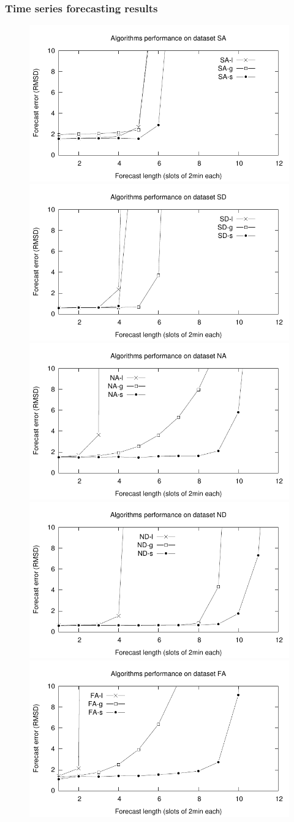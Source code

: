 \documentclass[12pt,a4paper,twoside,openright]{book}
\begin{document}
\subsubsection{Time series forecasting results}
\label{subsubsec:timeseries}
\begin{figure}
	\parbox{0.5\columnwidth}{\includegraphics[width=0.49\columnwidth]{img/algorithms-sa}}
	\parbox{0.5\columnwidth}{\includegraphics[width=0.49\columnwidth]{img/algorithms-sd}}
	\parbox{0.5\columnwidth}{\includegraphics[width=0.49\columnwidth]{img/algorithms-na}}
	\parbox{0.5\columnwidth}{\includegraphics[width=0.49\columnwidth]{img/algorithms-nd}}
	\parbox{0.5\columnwidth}{\includegraphics[width=0.49\columnwidth]{img/algorithms-fa}}

\end{figure}
\end{document}
